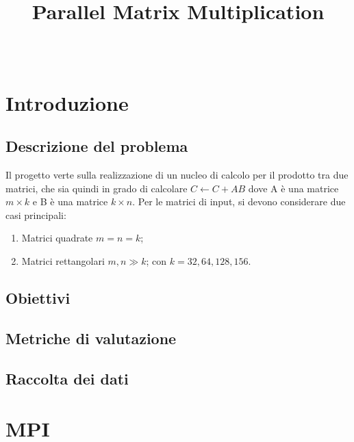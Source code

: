 \documentclass[conference]{IEEEtran}
\begin{document}
\title{Parallel Matrix Multiplication\\
}

\author{
\and
{}
\\
}


\maketitle

\begin{abstract}
\end{abstract}

\section{Introduzione}
\subsection{Descrizione del problema}
Il progetto verte sulla realizzazione di un nucleo di calcolo per il prodotto tra due matrici, che sia quindi in grado di calcolare
$C \leftarrow C + AB$
dove A è una matrice $m \times k$ e B è una matrice $k \times n$. Per le matrici di input, si devono considerare due casi principali:
\begin{enumerate}
    \item Matrici quadrate $m = n = k$;
    \item Matrici rettangolari $m, n \gg k$; con $k = 32, 64, 128, 156$.
\end{enumerate}

\subsection{Obiettivi}

\subsection{Metriche di valutazione}
\subsection{Raccolta dei dati}
\section{MPI}
\end{document}
